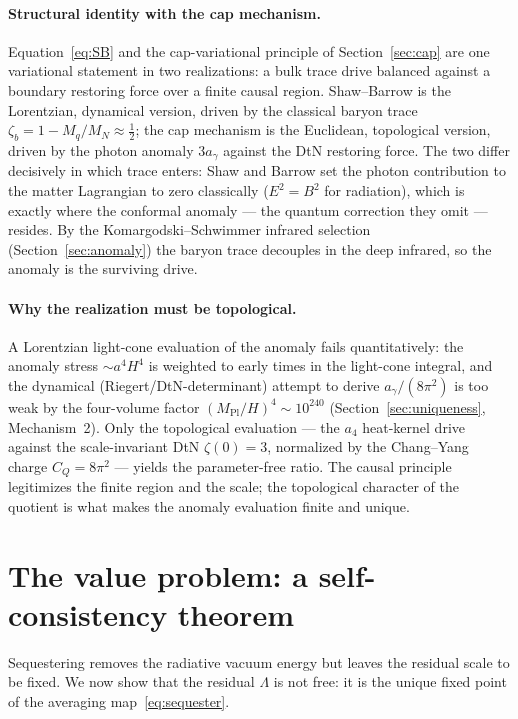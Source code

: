\documentclass[11pt,a4paper]{article}
\theoremstyle{plain}
\theoremstyle{definition}
\theoremstyle{remark}
\newcommand{\ag}{a_\gamma}
\newcommand{\CQ}{C_Q}
\newcommand{\Mpl}{M_{\mathrm{Pl}}}
\begin{document}
\paragraph{Structural identity with the cap mechanism.} Equation~\eqref{eq:SB} and the
cap-variational principle of Section~\ref{sec:cap} are one variational statement in two
realizations: a bulk trace drive balanced against a boundary restoring force over a finite causal
region. Shaw--Barrow is the Lorentzian, dynamical version, driven by the classical baryon trace
$\zeta_b = 1 - M_q/M_N \approx \tfrac12$; the cap mechanism is the Euclidean, topological version,
driven by the photon anomaly $3\ag$ against the DtN restoring force. The two differ decisively in
which trace enters: Shaw and Barrow set the photon contribution to the matter Lagrangian to zero
classically ($E^2 = B^2$ for radiation), which is exactly where the conformal anomaly --- the
quantum correction they omit --- resides. By the Komargodski--Schwimmer infrared selection
(Section~\ref{sec:anomaly}) the baryon trace decouples in the deep infrared, so the anomaly is the
surviving drive.

\paragraph{Why the realization must be topological.} A Lorentzian light-cone evaluation of the
anomaly fails quantitatively: the anomaly stress $\sim a^4 H^4$ is weighted to early times in the
light-cone integral, and the dynamical (Riegert/DtN-determinant) attempt to derive
$\ag/(8\pi^2)$ is too weak by the four-volume factor $(\Mpl/H)^4 \sim 10^{240}$
(Section~\ref{sec:uniqueness}, Mechanism~2). Only the topological evaluation --- the $a_4$
heat-kernel drive against the scale-invariant DtN $\zeta(0) = 3$, normalized by the Chang--Yang
charge $\CQ = 8\pi^2$ --- yields the parameter-free ratio. The causal principle legitimizes the
finite region and the scale; the topological character of the quotient is what makes the anomaly
evaluation finite and unique.

\section{The value problem: a self-consistency theorem}
\label{sec:theorem64}

Sequestering removes the radiative vacuum energy but leaves the residual scale to be fixed. We
now show that the residual $\Lambda$ is not free: it is the unique fixed point of the averaging
map~\eqref{eq:sequester}.
\end{document}
